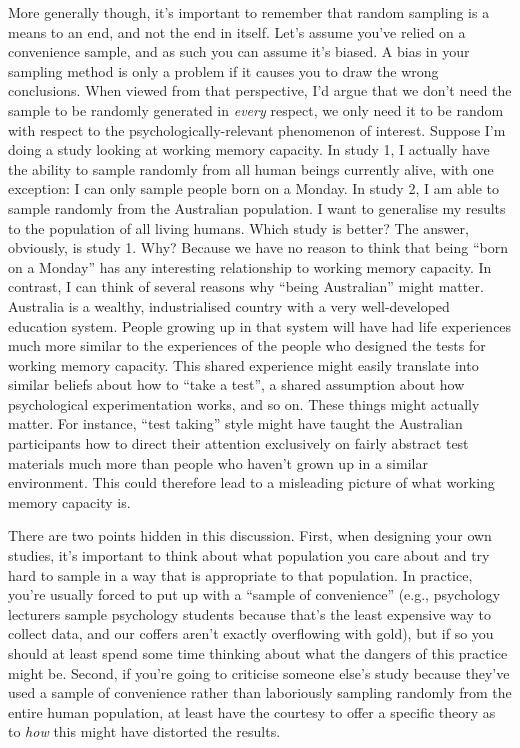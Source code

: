 More generally though, it's important to remember that random sampling is a means to an end, and not the end in itself. Let's assume you've relied on a convenience sample, and as such you can assume it's biased. A bias in your sampling method is only a problem if it causes you to draw the wrong conclusions. When viewed from that perspective, I'd argue that we don't need the sample to be randomly generated in {\it every} respect, we only need it to be random with respect to the psychologically-relevant phenomenon of interest. Suppose I'm doing a study looking at working memory capacity. In study 1, I actually have the ability to sample randomly from all human beings currently alive, with one exception: I can only sample people born on a Monday. In study 2, I am able to sample randomly from the Australian population. I want to generalise my results to the population of all living humans. Which study is better? The answer, obviously, is study 1. Why? Because we have no reason to think that being ``born on a Monday'' has any interesting relationship to working memory capacity. In contrast, I can think of several reasons why ``being Australian'' might matter. Australia is a wealthy, industrialised country with a very well-developed education system. People growing up in that system will have had life experiences much more similar to the experiences of the people who designed the tests for working memory capacity. This shared experience might easily translate into similar beliefs about how to ``take a test'', a shared assumption about how psychological experimentation works, and so on. These things might actually matter. For instance, ``test taking'' style might have taught the Australian participants how to direct their attention exclusively on fairly abstract test materials much more than people who haven't grown up in a similar environment. This could therefore lead to a misleading picture of what working memory capacity is. 

There are two points hidden in this discussion. First, when designing your own studies, it's important to think about what population you care about and try hard to sample in a way that is appropriate to that population. In practice, you're usually forced to put up with a ``sample of convenience'' (e.g., psychology lecturers sample psychology students because that's the least expensive way to collect data, and our coffers aren't exactly overflowing with gold), but if so you should at least spend some time thinking about what the dangers of this practice might be. Second, if you're going to criticise someone else's study because they've used a sample of convenience rather than laboriously sampling randomly from the entire human population, at least have the courtesy to offer a specific theory as to {\it how} this might have distorted the results. 

